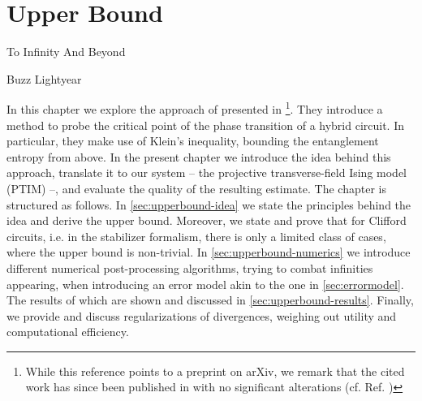 \chapter{Upper Bound}
\label{ch:rel-ent}
\epigraph{To Infinity And Beyond}{Buzz Lightyear}

%
In this chapter we explore the approach of
\citeauthor{garrattProbingPostmeasurementEntanglement2023} presented in
\cite{garrattProbingPostmeasurementEntanglement2023}\footnote{While this
  reference points to a preprint on arXiv, we remark that the cited work has
since been published in
 with no
significant alterations (cf. Ref.
\cite{garrattProbingPostmeasurementEntanglement2024})}. They introduce a method
to probe the critical point of the phase transition of a hybrid circuit. In
particular, they make use of Klein's inequality, bounding the entanglement
entropy from above. In the present chapter we introduce the idea behind this
approach, translate it to our system -- the projective transverse-field Ising
model (PTIM) --, and evaluate the quality of the resulting estimate. The
chapter is structured as follows. In \cref{sec:upperbound-idea} we state the
principles behind the idea and derive the upper bound. Moreover, we state and
prove that for Clifford circuits, i.e. in the stabilizer formalism, there is
only a limited class of cases, where the upper bound is non-trivial. In
\cref{sec:upperbound-numerics} we introduce different numerical post-processing
algorithms, trying to combat infinities appearing, when introducing an error
model akin to the one in \cref{sec:errormodel}. The results of which are shown
and discussed in \cref{sec:upperbound-results}. Finally, we provide and discuss
regularizations of divergences, weighing out utility and computational
efficiency.

%
%
\clearpage
